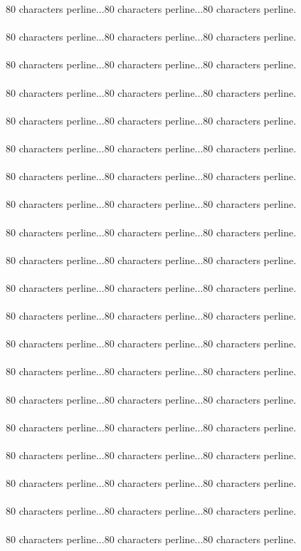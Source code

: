 {80 characters perline...80 characters perline...80 characters perline.\asdf\\\\
80 characters perline...80 characters perline...80 characters perline.\asdf\\\\
80 characters perline...80 characters perline...80 characters perline.\asdf\\\\
80 characters perline...80 characters perline...80 characters perline.\asdf\\\\
80 characters perline...80 characters perline...80 characters perline.\asdf\\\\
80 characters perline...80 characters perline...80 characters perline.\asdf\\\\
80 characters perline...80 characters perline...80 characters perline.\asdf\\\\
80 characters perline...80 characters perline...80 characters perline.\asdf\\\\
80 characters perline...80 characters perline...80 characters perline.\asdf\\\\
80 characters perline...80 characters perline...80 characters perline.\asdf\\\\
80 characters perline...80 characters perline...80 characters perline.\asdf\\\\
80 characters perline...80 characters perline...80 characters perline.\asdf\\\\
80 characters perline...80 characters perline...80 characters perline.\asdf\\\\
80 characters perline...80 characters perline...80 characters perline.\asdf\\\\
80 characters perline...80 characters perline...80 characters perline.\asdf\\\\
80 characters perline...80 characters perline...80 characters perline.\asdf\\\\
80 characters perline...80 characters perline...80 characters perline.\asdf\\\\
80 characters perline...80 characters perline...80 characters perline.\asdf\\\\
80 characters perline...80 characters perline...80 characters perline.\asdf\\\\
80 characters perline...80 characters perline...80 characters perline.\asdf\\\\
}
